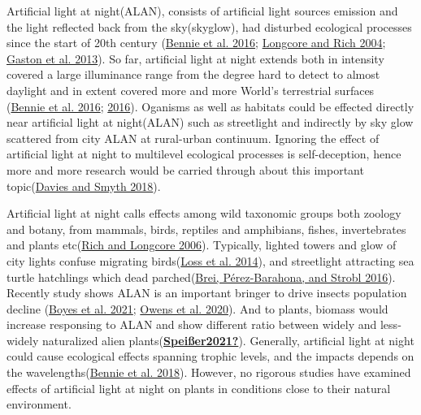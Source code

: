 \documentclass[
]{article}
\begin{document}
Artificial light at night(ALAN), consists of artificial light sources
emission and the light reflected back from the sky(skyglow), had
disturbed ecological processes since the start of 20th century
(\protect\hyperlink{ref-Bennie2016}{Bennie et al. 2016};
\protect\hyperlink{ref-Longcore2004}{Longcore and Rich 2004};
\protect\hyperlink{ref-Gaston2013}{Gaston et al. 2013}). So far,
artificial light at night extends both in intensity covered a large
illuminance range from the degree hard to detect to almost daylight and
in extent covered more and more World's terrestrial surfaces
(\protect\hyperlink{ref-Bennie2016}{Bennie et al. 2016};
\protect\hyperlink{ref-Falchi2016}{2016}). Oganisms as well as habitats
could be effected directly near artificial light at night(ALAN) such as
streetlight and indirectly by sky glow scattered from city ALAN at
rural-urban continuum. Ignoring the effect of artificial light at night
to multilevel ecological processes is self-deception, hence more and
more research would be carried through about this important
topic(\protect\hyperlink{ref-Davies2018}{Davies and Smyth 2018}).

Artificial light at night calls effects among wild taxonomic groups both
zoology and botany, from mammals, birds, reptiles and amphibians,
fishes, invertebrates and plants
etc(\protect\hyperlink{ref-Rich2006}{Rich and Longcore 2006}).
Typically, lighted towers and glow of city lights confuse migrating
birds(\protect\hyperlink{ref-Loss2014}{Loss et al. 2014}), and
streetlight attracting sea turtle hatchlings which dead
parched(\protect\hyperlink{ref-Brei2016}{Brei, Pérez-Barahona, and
Strobl 2016}). Recently study shows ALAN is an important bringer to
drive insects population decline
(\protect\hyperlink{ref-Boyes2021}{Boyes et al. 2021};
\protect\hyperlink{ref-Owens2020}{Owens et al. 2020}). And to plants,
biomass would increase responsing to ALAN and show different ratio
between widely and less‐widely naturalized alien
plants(\protect\hyperlink{ref-Speiuxdfer2021}{\textbf{Speißer2021?}}).
Generally, artificial light at night could cause ecological effects
spanning trophic levels, and the impacts depends on the
wavelengths(\protect\hyperlink{ref-Bennie2018}{Bennie et al. 2018}).
However, no rigorous studies have examined effects of artificial light
at night on plants in conditions close to their natural environment.
\end{document}
